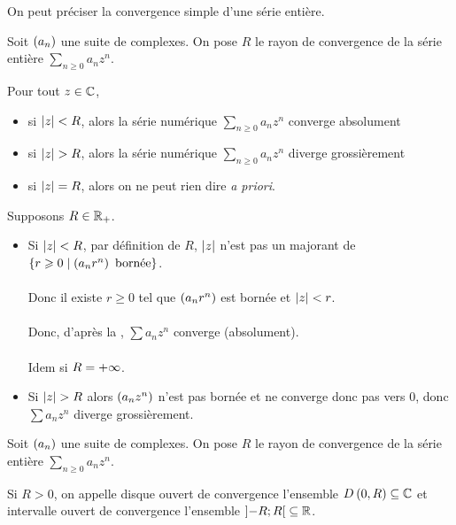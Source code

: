 On peut préciser la convergence simple d'une série entière.

\begin{prop}
Soit \(\left(a_n\right)\) une suite de complexes. On pose \(R\) le rayon de convergence de la série entière \(\sum_{n\geq0}a_nz^n\).

Pour tout \(z\in\mathbb{C}\),

\begin{itemize}
    \item si \(\left\lvert z\right\rvert<R\), alors la série numérique \(\sum_{n\geq0}a_nz^n\) converge absolument \\
    \item si \(\left\lvert z\right\rvert>R\), alors la série numérique \(\sum_{n\geq0}a_nz^n\) diverge grossièrement \\
    \item si \(\left\lvert z\right\rvert=R\), alors on ne peut rien dire \textit{a priori}.
\end{itemize}
\end{prop}

\begin{dem}
Supposons \(R\in\mathbb{R}_+\).

\begin{itemize}
    \item Si \(\left\lvert z\right\rvert<R\), par définition de \(R\), \(\left\lvert z\right\rvert\) n'est pas un majorant de \(\left\lbrace r\geqslant0\;\middle|\;\left(a_nr^n\right)\text{ bornée}\right\rbrace\). \\\\ Donc il existe \(r\geq0\) tel que \(\left(a_nr^n\right)\) est bornée et \(\left\lvert z\right\rvert<r\). \\\\ Donc, d'après la , \(\sum a_nz^n\) converge (absolument). \\\\ Idem si \(R=+\infty\). \\
    \item Si \(\left\lvert z\right\rvert>R\) alors \(\left(a_nz^n\right)\) n'est pas bornée et ne converge donc pas vers \(0\), donc \(\sum a_nz^n\) diverge grossièrement.
\end{itemize}
\end{dem}

\begin{defi}
Soit \(\left(a_n\right)\) une suite de complexes. On pose \(R\) le rayon de convergence de la série entière \(\sum_{n\geq0}a_nz^n\).

Si \(R>0\), on appelle disque ouvert de convergence l'ensemble \(\disqueo{0}{R}\subset\C\) et intervalle ouvert de convergence l'ensemble \(\left]-R;R\right[\subseteq\mathbb{R}\).
\end{defi}

